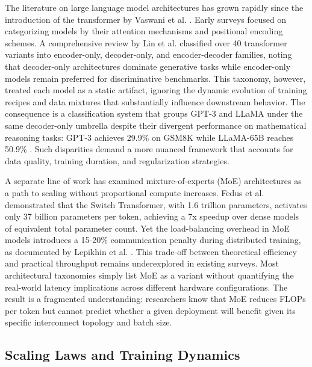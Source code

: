 \documentclass[journal]{IEEEtran}
\begin{document}
The literature on large language model architectures has grown rapidly since the introduction of the transformer by Vaswani et al. \cite{r6}. Early surveys focused on categorizing models by their attention mechanisms and positional encoding schemes. A comprehensive review by Lin et al. \cite{r7} classified over 40 transformer variants into encoder-only, decoder-only, and encoder-decoder families, noting that decoder-only architectures dominate generative tasks while encoder-only models remain preferred for discriminative benchmarks. This taxonomy, however, treated each model as a static artifact, ignoring the dynamic evolution of training recipes and data mixtures that substantially influence downstream behavior. The consequence is a classification system that groups GPT-3 and LLaMA under the same decoder-only umbrella despite their divergent performance on mathematical reasoning tasks: GPT-3 achieves 29.9\% on GSM8K while LLaMA-65B reaches 50.9\% \cite{r8}. Such disparities demand a more nuanced framework that accounts for data quality, training duration, and regularization strategies.

A separate line of work has examined mixture-of-experts (MoE) architectures as a path to scaling without proportional compute increases. Fedus et al. \cite{r9} demonstrated that the Switch Transformer, with 1.6 trillion parameters, activates only 37 billion parameters per token, achieving a 7x speedup over dense models of equivalent total parameter count. Yet the load-balancing overhead in MoE models introduces a 15-20\% communication penalty during distributed training, as documented by Lepikhin et al. \cite{r10}. This trade-off between theoretical efficiency and practical throughput remains underexplored in existing surveys. Most architectural taxonomies simply list MoE as a variant without quantifying the real-world latency implications across different hardware configurations. The result is a fragmented understanding: researchers know that MoE reduces FLOPs per token but cannot predict whether a given deployment will benefit given its specific interconnect topology and batch size.

\subsection{Scaling Laws and Training Dynamics}
\end{document}
